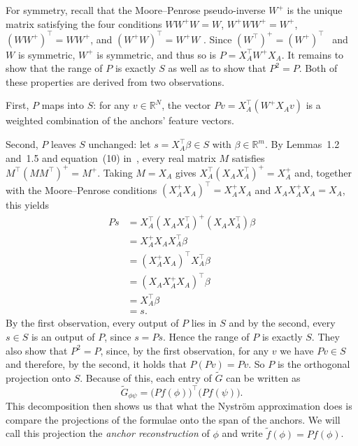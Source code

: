 \documentclass[titlepage,a4paper,11pt]{report}
\begin{document}
    For symmetry, recall that the Moore--Penrose pseudo-inverse $W^{+}$ is the unique matrix satisfying the four conditions $WW^{+}W=W$, $W^{+}WW^{+}=W^{+}$, $(WW^{+})^\top = WW^{+}$, and $(W^{+}W)^\top = W^{+}W$ \citep{penrose_generalized_1955}. Since $(W^\top)^{+}=(W^{+})^\top$~\citep{penrose_generalized_1955} and $W$ is symmetric, $W^{+}$ is symmetric, and thus so is $P=X_A^\top W^{+}X_A$. It remains to show that the range of $P$ is exactly $S$ as well as to show that $P^2 = P$. Both of these properties are derived from two observations.
    
    First, $P$ maps into $S$: for any $v\in\mathbb R^N$, the vector $Pv=X_A^\top(W^{+}X_Av)$ is a weighted combination of the anchors' feature vectors.  
    
    Second, $P$ leaves $S$ unchanged: let $s = X_A^\top\beta \in S$ with $\beta \in \mathbb{R}^m$. By Lemmas~1.2 and~1.5 and equation~(10) in~\cite{penrose_generalized_1955}, every real matrix $M$ satisfies $M^\top (MM^\top)^{+} = M^{+}$. Taking $M = X_A$ gives $X_A^\top (X_AX_A^\top)^{+} = X_A^{+}$ and, together with the Moore--Penrose conditions $(X_A^{+}X_A)^\top = X_A^{+}X_A$ and $X_AX_A^{+}X_A = X_A$, this yields
    \begin{align*}
        Ps & = X_A^\top (X_AX_A^\top)^{+}(X_AX_A^\top)\beta\\
           & = X_A^{+}X_AX_A^\top\beta\\
           & = (X_A^{+}X_A)^\top X_A^\top\beta\\
           & = (X_AX_A^{+}X_A)^\top\beta\\
           & = X_A^\top\beta\\
           & = s.
    \end{align*}
    By the first observation, every output of $P$ lies in $S$ and by the second, every $s\in S$ is an output of $P$, since $s=Ps$. Hence the range of $P$ is exactly $S$. They also show that $P^2=P$, since, by the first observation, for any $v$ we have $Pv\in S$ and therefore, by the second, it holds that $P(Pv)=Pv$. So $P$ is the orthogonal projection onto $S$. Because of this, each entry of $\tilde G$ can be written as
    \begin{equation}\label{eq:nys_entries}
      \tilde G_{\phi\psi} = \bigl(Pf(\phi)\bigr)^\top\bigl(Pf(\psi)\bigr).
    \end{equation}
    This decomposition then shows us that what the Nyström approximation does is compare the projections of the formulae onto the span of the anchors. We will call this projection the \emph{anchor reconstruction} of $\phi$ and write $\tilde f(\phi) = Pf(\phi)$.
\end{document}
